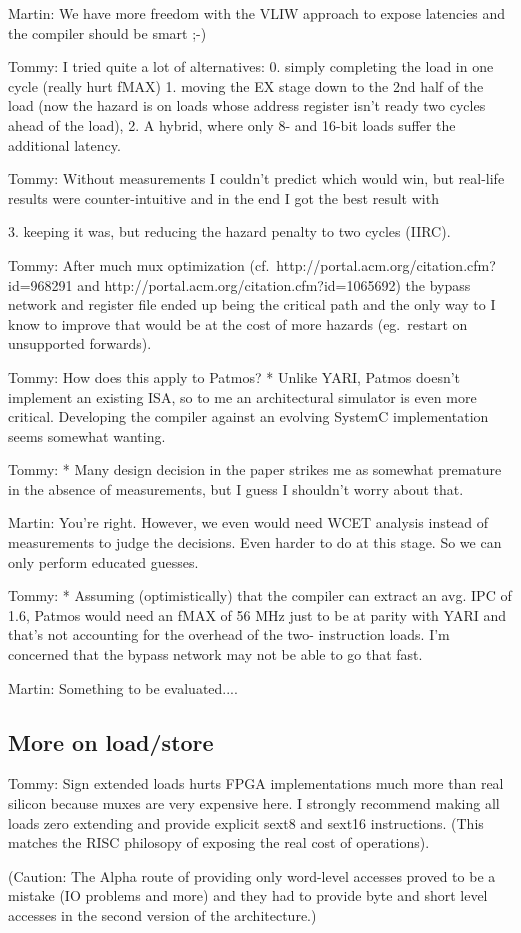 \documentclass{IEEEtran}
\newcommand{\tommy}[1]{{\color{red} Tommy: #1}}
\newcommand{\martin}[1]{{\color{blue} Martin: #1}}
\begin{document}
 \martin{We have more freedom with the VLIW approach to
 expose latencies and the compiler should be smart ;-)}

\tommy{I tried quite a lot of alternatives:
 0. simply completing the load in one cycle (really hurt fMAX)
 1. moving the EX stage down to the 2nd half of the load (now
    the hazard is on loads whose address register isn't ready
    two cycles ahead of the load),
 2. A hybrid, where only 8- and 16-bit loads suffer the additional
   latency.}

\tommy{ Without measurements I couldn't predict which would win, but
 real-life results were counter-intuitive and in the end I got the
 best result with

 3. keeping it was, but reducing the hazard penalty to two
  cycles (IIRC).}

\tommy{After much mux optimization
  (cf.~http://portal.acm.org/citation.cfm?id=968291 and
  http://portal.acm.org/citation.cfm?id=1065692)
 the bypass network and register file ended up being the critical
 path and the only way to I know to improve that would be at
 the cost of more hazards (eg.~restart on unsupported forwards).}


\tommy{How does this apply to Patmos?
* Unlike YARI, Patmos doesn't implement an existing ISA, so to
 me an architectural simulator is even more critical. Developing
 the compiler against an evolving SystemC implementation
 seems somewhat wanting.}

\tommy{* Many design decision in the paper strikes me as somewhat
 premature in the absence of measurements, but I guess I
 shouldn't worry about that.}

\martin{You're right. However, we even would need WCET analysis instead
of measurements to judge the decisions. Even harder to do at this
stage. So we can only perform educated guesses.}

\tommy{* Assuming (optimistically) that the compiler can extract an avg. IPC
 of 1.6, Patmos would need an fMAX of 56 MHz just to be at parity
 with YARI and that's not accounting for the overhead of the two-
 instruction loads. I'm concerned that the bypass network may not
 be able to go that fast.}

\martin{Something to be evaluated....}


\subsection{More on load/store}

\tommy{Sign extended loads hurts FPGA implementations much more than real
silicon because muxes are very expensive here. I strongly recommend
making all loads zero extending and provide explicit sext8 and sext16
instructions. (This matches the RISC philosopy of exposing the real
cost of operations).

(Caution: The Alpha route of providing only word-level accesses proved to be a mistake (IO
problems and more) and they had to provide byte and short level accesses
in the second version of the architecture.)}
\end{document}
